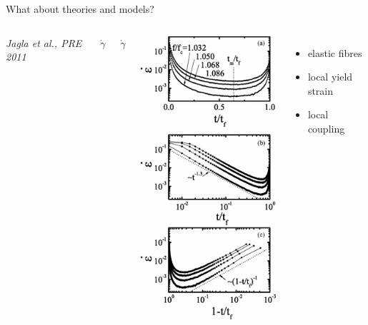 \begin{frame}{What about theories and models?}
\begin{columns}

\textit{\footnotesize Jagla et al., PRE 2011}

\begin{minipage}[b][10\baselineskip][c]{1em}
$\dot\gamma$

\vspace{4\baselineskip}
$\dot\gamma$
\end{minipage}\includegraphics[height=10\baselineskip, clip=true, trim=7mm 0 0 6cm]{Jagla_2011_3regimes}


\begin{itemize}
\item elastic fibres
\item local yield strain
\item local coupling
\end{itemize}



\end{columns}
\end{frame}
